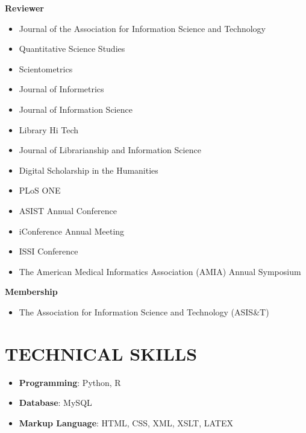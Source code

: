 \documentclass[margin, 10pt]{res} %
\begin{document}
\begin{resume}
\textbf{Reviewer}
\begin{itemize}
\item Journal of the Association for Information Science and Technology
\item Quantitative Science Studies
\item Scientometrics
\item Journal of Informetrics
\item Journal of Information Science
\item Library Hi Tech
\item Journal of Librarianship and Information Science
\item Digital Scholarship in the Humanities
\item PLoS ONE
\item ASIST Annual Conference
\item iConference Annual Meeting
\item ISSI Conference
\item The American Medical Informatics Association (AMIA) Annual Symposium
\end{itemize}

\textbf{Membership}
\begin{itemize}
\item The Association for Information Science and Technology (ASIS\&T)
\end{itemize}

\section{TECHNICAL SKILLS}
\begin{itemize}
\item \textbf{Programming}: Python, R
\item \textbf{Database}: MySQL
\item \textbf{Markup Language}: HTML, CSS, XML, XSLT, LATEX
\end{itemize}



\end{resume}
\end{document}
